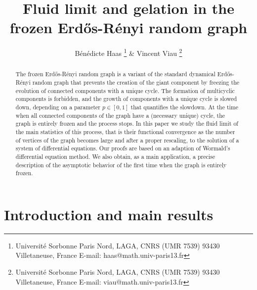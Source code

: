 \documentclass[a4, 11pt]{article}
\date{}
\title{Fluid limit and gelation in the frozen Erd\H{o}s-R\'enyi random graph}
\author{B\'en\'edicte Haas \thanks{Universit\'e Sorbonne Paris Nord, LAGA, CNRS (UMR  7539) 93430 Villetaneuse, France \newline \hspace*{0.5cm} E-mail: haas@math.univ-paris13.fr}  \quad \& \hspace{0.2cm}  Vincent Viau \thanks{Universit\'e Sorbonne Paris Nord, LAGA, CNRS (UMR  7539) 93430 Villetaneuse, France \newline \hspace*{0.5cm} E-mail: viau@math.univ-paris13.fr}}
\numberwithin{equation}{section}
\theoremstyle{plain}
\theoremstyle{definition}
\theoremstyle{remark}
\begin{document}
\let\oldproofname=\proofname
\renewcommand{\proofname}{\rm\bf{\oldproofname}}

\maketitle

\begin{abstract}
The frozen Erd\H{o}s-R\'enyi random graph is a variant of the  standard dynamical Erd\H{o}s-R\'enyi random graph that prevents the creation of the giant component by freezing the evolution of connected components with a unique cycle. The formation of multicyclic components is forbidden, and the growth of components with a unique cycle is slowed down, depending on a parameter $p \in [0,1]$ that quantifies the slowdown. At the time when all connected components of the graph have a (necessary unique) cycle, the graph is entirely frozen and the process stops.  In this paper we study the fluid limit of the main statistics of this process, that is their functional convergence as the number of vertices of the graph becomes large and after a proper rescaling, to the solution of a system of differential equations. Our proofs are based on an adaption of Wormald's differential equation method. We also obtain, as a main application, a precise description of the asymptotic behavior of the first time when the graph is entirely frozen. 
\end{abstract}

\tableofcontents


\section{Introduction and main results}
\end{document}
